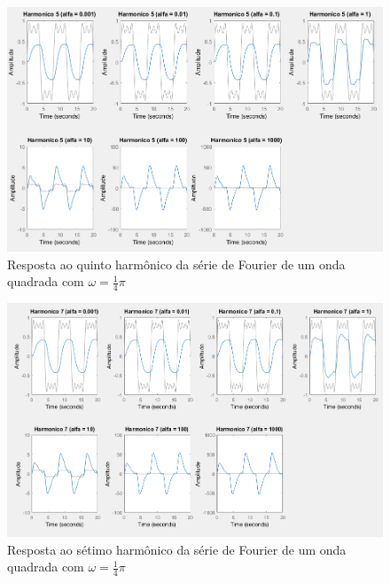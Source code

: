 \documentclass[a4paper, 12pt]{article}
\begin{document}
			\begin{figure}[!ht]
				\centering
				\includegraphics[scale=0.5]{img/3i_alfa.png}
				\caption{Resposta ao quinto harmônico da série de Fourier de um onda quadrada com $\omega = \frac{1}{4}\pi$}
			\end{figure}
			\begin{figure}[!ht]
				\centering
				\includegraphics[scale=0.57]{img/3j_alfa.png}
				\caption{Resposta ao sétimo harmônico da série de Fourier de um onda quadrada com $\omega = \frac{1}{4}\pi$}
			\end{figure}
			\clearpage
\end{document}
